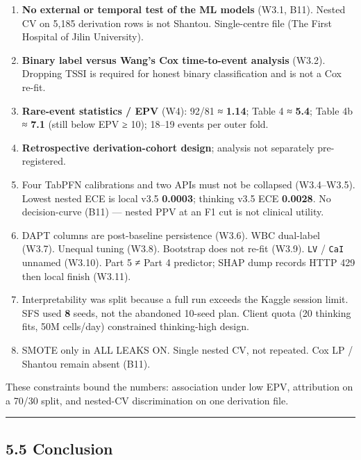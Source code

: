 \documentclass[
]{article}
\providecommand{\tightlist}{%
  \setlength{\itemsep}{0pt}\setlength{\parskip}{0pt}}
\begin{document}
\begin{enumerate}
\def\labelenumi{\arabic{enumi}.}
\tightlist
\item
  \textbf{No external or temporal test of the ML models} (W3.1, B11).
  Nested CV on 5,185 derivation rows is not Shantou. Single-centre file
  (The First Hospital of Jilin University).
\item
  \textbf{Binary label versus Wang's Cox time-to-event analysis} (W3.2).
  Dropping TSSI is required for honest binary classification and is not
  a Cox re-fit.
\item
  \textbf{Rare-event statistics / EPV} (W4): 92/81 ≈ \textbf{1.14};
  Table 4 ≈ \textbf{5.4}; Table 4b ≈ \textbf{7.1} (still below EPV ≥
  10); 18--19 events per outer fold.
\item
  \textbf{Retrospective derivation-cohort design}; analysis not
  separately pre-registered.
\item
  Four TabPFN calibrations and two APIs must not be collapsed
  (W3.4--W3.5). Lowest nested ECE is local v3.5 \textbf{0.0003};
  thinking v3.5 ECE \textbf{0.0028}. No decision-curve (B11) --- nested
  PPV at an F1 cut is not clinical utility.
\item
  DAPT columns are post-baseline persistence (W3.6). WBC dual-label
  (W3.7). Unequal tuning (W3.8). Bootstrap does not re-fit (W3.9).
  \texttt{LV} / \texttt{CaI} unnamed (W3.10). Part 5 ≠ Part 4 predictor;
  SHAP dump records HTTP 429 then local finish (W3.11).
\item
  Interpretability was split because a full run exceeds the Kaggle
  session limit. SFS used \textbf{8} seeds, not the abandoned 10-seed
  plan. Client quota (20 thinking fits, 50M cells/day) constrained
  thinking-high design.
\item
  SMOTE only in ALL LEAKS ON. Single nested CV, not repeated. Cox LP /
  Shantou remain absent (B11).
\end{enumerate}

These constraints bound the numbers: association under low EPV,
attribution on a 70/30 split, and nested-CV discrimination on one
derivation file.

\begin{center}\rule{0.5\linewidth}{0.5pt}\end{center}

\subsection{5.5 Conclusion}\label{conclusion}
\end{document}
